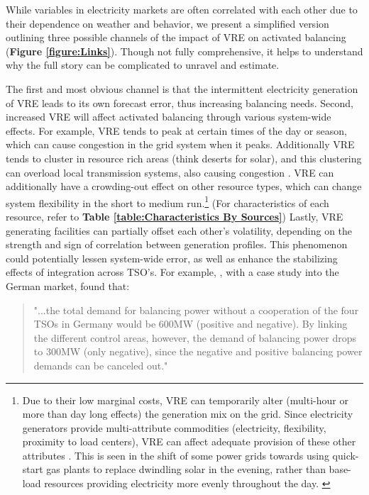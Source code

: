 \documentclass[12pt]{article}
\begin{document}
While variables in electricity markets are often correlated with each other due to their dependence on weather and behavior, we present a simplified version outlining three possible channels of the impact of VRE on activated balancing (\textbf{Figure \ref{figure:Links}}). Though not fully comprehensive, it helps to understand why the full story can be complicated to unravel and estimate. \par

The first and most obvious channel is that the intermittent electricity generation of VRE leads to its own forecast error, thus increasing balancing needs. Second, increased VRE will affect activated balancing through various system-wide effects. For example, VRE tends to peak at certain times of the day or season, which can cause congestion in the grid system when it peaks. Additionally VRE tends to cluster in resource rich areas (think deserts for solar), and this clustering can overload local transmission systems, also causing congestion \citep{steen2014challenges}. VRE can additionally have a crowding-out effect on other resource types, which can change system flexibility in the short to medium run.\footnote{Due to their low marginal costs, VRE can temporarily alter (multi-hour or more than day long effects) the generation mix on the grid. Since electricity generators provide multi-attribute commodities (electricity, flexibility, proximity to load centers), VRE can affect adequate provision of these other attributes \citep{parsons2015financial}. This is seen in the shift of some power grids towards using quick-start gas plants to replace dwindling solar in the evening, rather than base-load resources providing electricity more evenly throughout the day. \citep{steen2014challenges}} (For characteristics of each resource, refer to \textbf{Table \ref{table:Characteristics By Sources}}) Lastly, VRE generating facilities can partially offset each other's volatility, depending on the strength and sign of correlation between generation profiles. This phenomenon could potentially lessen system-wide error, as well as enhance the stabilizing effects of integration across TSO's. For example, \citet{Ocker2017}, with a case study into the German market, found that: \begin{quote}
    "...the total demand for balancing power without a cooperation of the four TSOs in Germany would be 600MW (positive and negative). By linking the different control areas, however, the demand of balancing power drops to 300MW (only negative), since the negative and positive balancing power demands can be canceled out."\end{quote}\par
\end{document}
